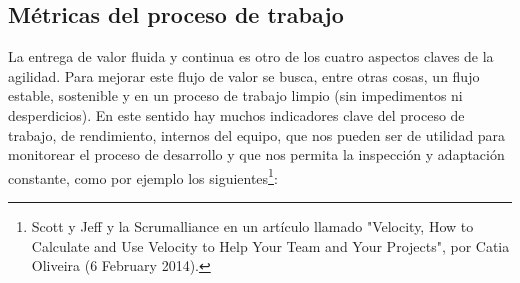 \subsection{Métricas del proceso de trabajo}

La entrega de valor fluida y continua es otro de los cuatro aspectos claves de la agilidad. Para mejorar este flujo de valor se busca, entre otras cosas, un flujo estable, sostenible y en un proceso de trabajo limpio (sin impedimentos ni desperdicios). En este sentido hay muchos indicadores clave del proceso de trabajo, de rendimiento, internos del equipo, que nos pueden ser de utilidad para monitorear el proceso de desarrollo y que nos permita la inspección y adaptación constante, como por ejemplo los siguientes\footnote{Scott y Jeff \cite{Scott-Jeff-2013} y la  Scrumalliance en un artículo llamado "Velocity, How to Calculate and Use Velocity to Help Your Team and Your Projects", por Catia Oliveira (6 February 2014).}:

